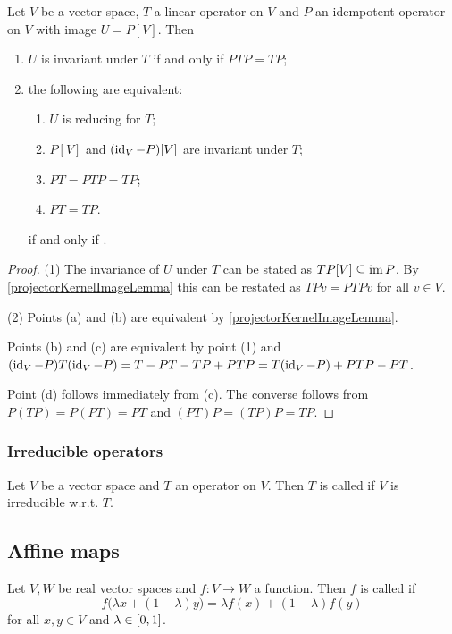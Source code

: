\begin{lemma}
Let $V$ be a vector space, $T$ a linear operator on $V$ and $P$ an idempotent operator on $V$ with image $U = P[V]$. Then 
\begin{enumerate}
\item $U$ is invariant under $T$ \textup{if and only if} $PTP = TP$;
\item the following are equivalent:
\begin{enumerate}
\item $U$ is reducing for $T$;
\item $P[V]$ and $(\operatorname{id}_V - P)[V]$ are invariant under $T$;
\item $PT = PTP = TP$;
\item $PT = TP$.
\end{enumerate} \textup{if and only if} .
\end{enumerate}
\end{lemma}
\begin{proof}
(1) The invariance of $U$ under $T$ can be stated as $TP[V] \subseteq \operatorname{im} P$. By \ref{projectorKernelImageLemma} this can be restated as $TPv = PTPv$ for all $v\in V$.

(2) Points (a) and (b) are equivalent by \ref{projectorKernelImageLemma}.

Points (b) and (c) are equivalent by point (1) and $(\operatorname{id}_V - P)T(\operatorname{id}_V - P) = T - PT - TP + PTP = T(\operatorname{id}_V - P) + PTP - PT$.

Point (d) follows immediately from (c). The converse follows from $P(TP) = P(PT) = PT$ and $(PT)P = (TP)P = TP$.
\end{proof}

\subsubsection{Irreducible operators}
\begin{definition}
Let $V$ be a vector space and $T$ an operator on $V$. Then $T$ is called  if $V$ is irreducible w.r.t. $T$.
\end{definition}

\subsection{Affine maps}
\begin{definition}
Let $V,W$ be real vector spaces and $f: V\to W$ a function. Then $f$ is called  if
\[ f\big(\lambda x + (1-\lambda)y\big) = \lambda f(x) + (1-\lambda)f(y) \]
for all $x,y\in V$ and $\lambda\in \interval{0,1}$.
\end{definition}

